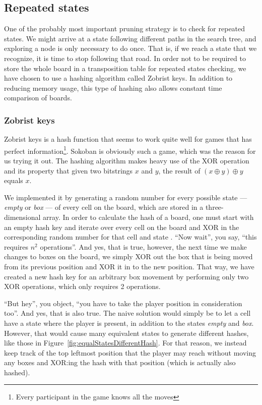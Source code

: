 \documentclass[a4paper,11pt]{article}
\renewcommand{\*}[0]{\cdot}
\begin{document}
\subsection{Repeated states}

One of the probably most important pruning strategy is to check for repeated
states. We might arrive at a state following different paths in the search tree,
and exploring a node is only necessary to do once. That is, if we reach a state
that we recognize, it is time to stop following that road. In order not to be
required to store the whole board in a transposition table for repeated states
checking, we have chosen to use a hashing algorithm called Zobrist keys. In
addition to reducing memory usage, this type of hashing also allows constant
time comparison of boards.


\subsubsection{Zobrist keys}

Zobrist keys is a hash function that seems to work quite well for games that has
perfect information\footnote{Every participant in the game knows all the moves}.
Sokoban is obviously such a game, which was the reason for us trying it out. The
hashing algorithm makes heavy use of the XOR operation and its property that
given two bitstrings $x$ and $y$, the result of $(x \oplus y) \oplus y$ equals
$x$.

We implemented it by generating a random number for every possible state ---
\emph{empty} or \emph{box} --- of every cell on the board, which are stored in a
three-dimensional array. In order to calculate the hash of a board, one must
start with an empty hash key and iterate over every cell on the board and
XOR in the corresponding random number for that cell and state . ``Now wait'',
you say, ``this requires $n^2$ operations''. And yes, that is true, however, the
next time we make changes to boxes on the board, we simply XOR out the box that
is being moved from its previous position and XOR it in to the new position.
That way, we have created a new hash key for an arbitrary box movement by
performing only two XOR operations, which only requires 2 operations.


``But hey'', you object, ``you have to take the player position in
consideration too''. And yes, that is also true. The naive solution would
simply be to let a cell have a state where the player is present, in addition
to the states \emph{empty} and \emph{box}. However, that would cause many
equivalent states to generate different hashes, like those in
Figure~\ref{fig:equalStatesDifferentHash}. For that reason, we instead keep
track of the top leftmost position that the player may reach without moving any
boxes and XOR:ing the hash with that position (which is actually also hashed).
\end{document}
